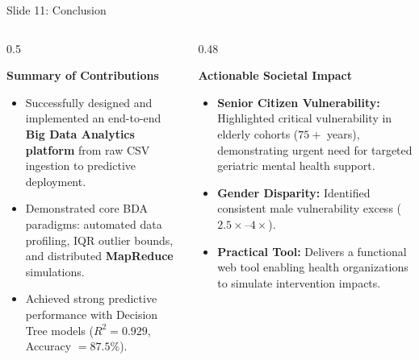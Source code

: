 \documentclass[10pt, aspectratio=169]{beamer}
\begin{document}
\begin{frame}{Slide 11: Conclusion}
    \begin{columns}[T]
        \begin{column}{0.5\textwidth}
            \begin{block}{\textbf{Summary of Contributions}}
                \begin{itemize}
                    \item Successfully designed and implemented an end-to-end \textbf{Big Data Analytics platform} from raw CSV ingestion to predictive deployment.
                    \item Demonstrated core BDA paradigms: automated data profiling, IQR outlier bounds, and distributed \textbf{MapReduce} simulations.
                    \item Achieved strong predictive performance with Decision Tree models ($R^2 = 0.929$, Accuracy $= 87.5\%$).
                \end{itemize}
            \end{block}
        \end{column}
        \begin{column}{0.48\textwidth}
            \begin{block}{\textbf{Actionable Societal Impact}}
                \begin{itemize}
                    \item \textbf{Senior Citizen Vulnerability:} Highlighted critical vulnerability in elderly cohorts ($75+$ years), demonstrating urgent need for targeted geriatric mental health support.
                    \item \textbf{Gender Disparity:} Identified consistent male vulnerability excess ($2.5\times$--$4\times$).
                    \item \textbf{Practical Tool:} Delivers a functional web tool enabling health organizations to simulate intervention impacts.
                \end{itemize}
            \end{block}
        \end{column}
    \end{columns}
\end{frame}
\end{document}
